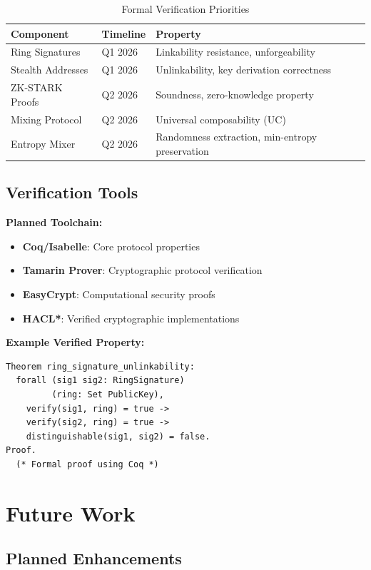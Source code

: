 \documentclass[12pt,a4paper]{article}
\begin{document}
\begin{table}[h]
\centering
\begin{tabular}{llp{5cm}}
\toprule
\textbf{Component} & \textbf{Timeline} & \textbf{Property} \\
\midrule
Ring Signatures & Q1 2026 & Linkability resistance, unforgeability \\
Stealth Addresses & Q1 2026 & Unlinkability, key derivation correctness \\
ZK-STARK Proofs & Q2 2026 & Soundness, zero-knowledge property \\
Mixing Protocol & Q2 2026 & Universal composability (UC) \\
Entropy Mixer & Q2 2026 & Randomness extraction, min-entropy preservation \\
\bottomrule
\end{tabular}
\caption{Formal Verification Priorities}
\end{table}

\subsection{Verification Tools}

\textbf{Planned Toolchain:}
\begin{itemize}
\item \textbf{Coq/Isabelle}: Core protocol properties
\item \textbf{Tamarin Prover}: Cryptographic protocol verification
\item \textbf{EasyCrypt}: Computational security proofs
\item \textbf{HACL*}: Verified cryptographic implementations
\end{itemize}

\textbf{Example Verified Property:}
\begin{verbatim}
Theorem ring_signature_unlinkability:
  forall (sig1 sig2: RingSignature)
         (ring: Set PublicKey),
    verify(sig1, ring) = true ->
    verify(sig2, ring) = true ->
    distinguishable(sig1, sig2) = false.
Proof.
  (* Formal proof using Coq *)
\end{verbatim}

\section{Future Work}

\subsection{Planned Enhancements}
\end{document}
